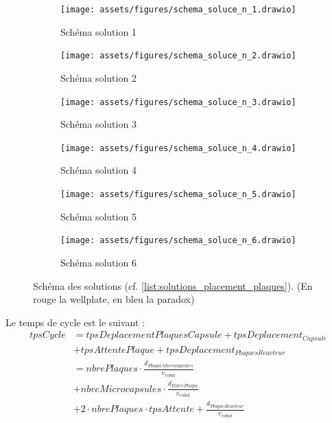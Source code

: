 \begin{figure}[H]
    \centering
    \begin{subfigure}{0.17\textwidth}
        \texttt{[image: assets/figures/schema\_soluce\_n\_1.drawio]}
        \caption{Schéma solution 1}
        \label{fig:schema_solution_1}
    \end{subfigure}
    \hfill
    \begin{subfigure}{0.17\textwidth}
        \texttt{[image: assets/figures/schema\_soluce\_n\_2.drawio]}
        \caption{Schéma solution 2}
        \label{fig:schema_solution_2}
    \end{subfigure}
    \hfill
    \begin{subfigure}{0.17\textwidth}
        \texttt{[image: assets/figures/schema\_soluce\_n\_3.drawio]}
        \caption{Schéma solution 3}
        \label{fig:schema_solution_3}
    \end{subfigure}

    \begin{subfigure}{0.17\textwidth}
        \texttt{[image: assets/figures/schema\_soluce\_n\_4.drawio]}
        \caption{Schéma solution 4}
        \label{fig:schema_solution_4}
    \end{subfigure}
    \hfill
    \begin{subfigure}{0.17\textwidth}
        \texttt{[image: assets/figures/schema\_soluce\_n\_5.drawio]}
        \caption{Schéma solution 5}
        \label{fig:schema_solution_5}
    \end{subfigure}
    \hfill
    \begin{subfigure}{0.17\textwidth}
        \texttt{[image: assets/figures/schema\_soluce\_n\_6.drawio]}
        \caption{Schéma solution 6}
        \label{fig:schema_solution_6}
    \end{subfigure}
    \caption{Schéma des solutions (cf. \ref{list:solutions_placement_plaques}). (En rouge la \gls{wellplate}, en bleu la \gls{paradox})}
\end{figure}
Le temps de cycle est le suivant :
\begin{align*}
    tpsCycle &= tpsDeplacementPlaquesCapsule + tpsDeplacement_{Capsule} \\
    &+ tpsAttentePlaque + tpsDeplacement_{PlaquesReacteur}\\
    &= nbrePlaques\cdot \frac{d_{PlaqueMicrocapsules}}{v_{robot}} \\&+ nbreMicrocapsules\cdot \frac{d_{EntrePlaque}}{v_{robot}} \\
    &+ 2\cdot nbrePlaques\cdot tpsAttente + \frac{d_{PlaqueReacteur}}{v_{robot}}
\end{align*}

